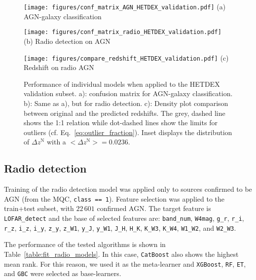 \documentclass{aa}
\begin{document}
\begin{figure}
  \centering
  \begin{minipage}{0.49\columnwidth}
    \centering
    \texttt{[image: figures/conf\_matrix\_AGN\_HETDEX\_validation.pdf]}\hfill\break
    {(a) AGN-galaxy classification}
  \end{minipage}%
  \begin{minipage}{0.49\columnwidth}
    \centering
    \texttt{[image: figures/conf\_matrix\_radio\_HETDEX\_validation.pdf]}\hfill\break
    {(b) Radio detection on AGN}
  \end{minipage}\hfill\break%
  \begin{minipage}{0.70\columnwidth}
    \centering
    \texttt{[image: figures/compare\_redshift\_HETDEX\_validation.pdf]}\hfill\break
    {(c) Redshift on radio AGN}
  \end{minipage}%
  \caption{Performance of individual models when applied to the HETDEX validation subset. a): confusion matrix for AGN-galaxy classification. 
  b): Same as a), but for radio detection. c): Density plot comparison between original and the predicted redshifts. 
  The grey, dashed line shows the 1:1 relation while dot-dashed lines show the limits for outliers (cf. Eq.~\ref{eq:outlier_fraction}). Inset displays the distribution of $\Delta z^{\mathrm{N}}$ with a ${{<}\Delta z^{\mathrm{N}}{>} = 0.0236}$.}
  \label{fig:results_models_validation}
\end{figure}

\subsection{Radio detection}\label{sec:results_radio}

Training of the radio detection model was applied only to sources confirmed to be AGN (from the MQC, \texttt{class == 1}).
Feature selection was applied to the train+test subset, with $22\,601$ confirmed AGN. 
The target feature is \verb|LOFAR_detect| and the base of selected features are:  \verb|band_num|, \verb|W4mag|, \verb|g_r|, \verb|r_i|, \verb|r_z|, \verb|i_z|, \verb|i_y|, \verb|z_y|, \verb|z_W1|, \verb|y_J|, \verb|y_W1|, \verb|J_H|, \verb|H_K|, \verb|K_W3|, \verb|K_W4|, \verb|W1_W2|, and \verb|W2_W3|.

The performance of the tested algorithms is shown in Table~\ref{table:fit_radio_models}. 
In this case, \verb|CatBoost| also shows the highest mean rank. For this reason, we used it as the meta-learner and \verb|XGBoost|, \verb|RF|, \verb|ET|, and \verb|GBC| were selected as base-learners.
\end{document}
